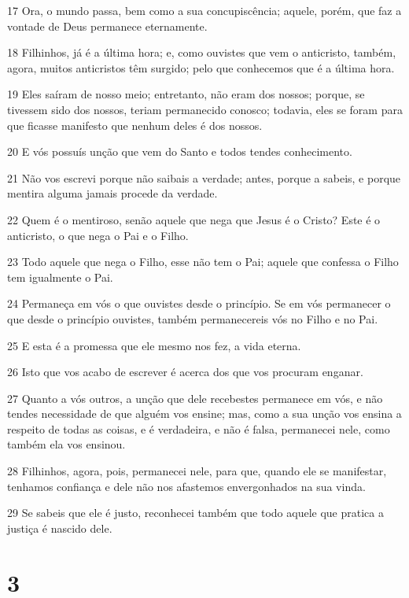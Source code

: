 \par 17 Ora, o mundo passa, bem como a sua concupiscência; aquele, porém, que faz a vontade de Deus permanece eternamente.
\par 18 Filhinhos, já é a última hora; e, como ouvistes que vem o anticristo, também, agora, muitos anticristos têm surgido; pelo que conhecemos que é a última hora.
\par 19 Eles saíram de nosso meio; entretanto, não eram dos nossos; porque, se tivessem sido dos nossos, teriam permanecido conosco; todavia, eles se foram para que ficasse manifesto que nenhum deles é dos nossos.
\par 20 E vós possuís unção que vem do Santo e todos tendes conhecimento.
\par 21 Não vos escrevi porque não saibais a verdade; antes, porque a sabeis, e porque mentira alguma jamais procede da verdade.
\par 22 Quem é o mentiroso, senão aquele que nega que Jesus é o Cristo? Este é o anticristo, o que nega o Pai e o Filho.
\par 23 Todo aquele que nega o Filho, esse não tem o Pai; aquele que confessa o Filho tem igualmente o Pai.
\par 24 Permaneça em vós o que ouvistes desde o princípio. Se em vós permanecer o que desde o princípio ouvistes, também permanecereis vós no Filho e no Pai.
\par 25 E esta é a promessa que ele mesmo nos fez, a vida eterna.
\par 26 Isto que vos acabo de escrever é acerca dos que vos procuram enganar.
\par 27 Quanto a vós outros, a unção que dele recebestes permanece em vós, e não tendes necessidade de que alguém vos ensine; mas, como a sua unção vos ensina a respeito de todas as coisas, e é verdadeira, e não é falsa, permanecei nele, como também ela vos ensinou.
\par 28 Filhinhos, agora, pois, permanecei nele, para que, quando ele se manifestar, tenhamos confiança e dele não nos afastemos envergonhados na sua vinda.
\par 29 Se sabeis que ele é justo, reconhecei também que todo aquele que pratica a justiça é nascido dele.

\chapter{3}

